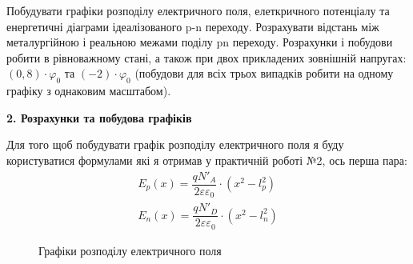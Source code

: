 \documentclass[14pt,a4paper]{scrartcl}
\begin{document}
Побудувати графіки розподілу електричного поля, елеткричного потенціалу та енергетичні діаграми ідеалізованого p-n переходу. Розрахувати відстань між металургійною і реальною межами поділу pn переходу. Розрахунки і побудови робити в рівноважному стані, а також при двох прикладених зовнішній напругах: $(0,8)\cdot \varphi_0$ та $(-2)\cdot \varphi_0$ (побудови для всіх трьох випадків робити на одному графіку з однаковим масштабом).\\


\newpage
\begin{center}\textbf{2. Розрахунки та побудова графіків}\\ \end{center}


Для того щоб побудувати графік розподілу електричного поля я буду користуватися формулами які я отримав у практичній роботі №2, ось перша пара:
\begin{align}
E_p(x) = \dfrac{qN'_A}{2\varepsilon\varepsilon_0} \cdot (x^2-l_p^2)\\
E_n(x) = \dfrac{qN'_D}{2\varepsilon\varepsilon_0}\cdot(x^2-l_n^2)
\end{align}

\begin{center}
\begin{figure}[h]
\caption{Графіки розподілу електричного поля}
\label{ris:image1}
\end{figure}
\end{center}
\end{document}
